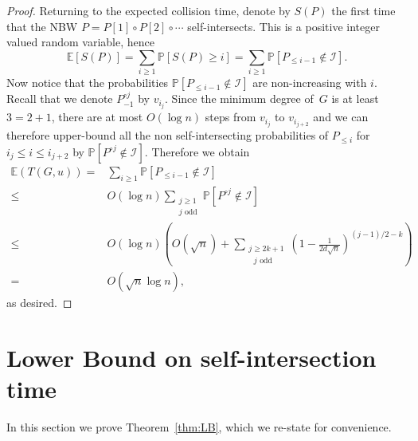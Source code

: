 \documentclass[11pt,a4paper]{article}
\theoremstyle{plain}
\def\calI{\mathcal{I}}
\renewcommand{\Pr}{\mathbb{P}}
\begin{document}
\begin{proof}
Returning to the expected collision time, denote by $S(P)$ the first time that the NBW $P=P[1]\circ P[2]\circ \cdots$ self-intersects. This is a positive integer valued random variable, hence 
$$
\mathbb{E}[S(P)]=\sum_{i\geq 1} \Pr[S(P)\geq i] = \sum_{i\ge 1} \Pr[P_{\leq i-1} \notin \calI].
$$
Now notice that  the probabilities $\Pr[P_{\leq i-1} \notin \calI]$ are  non-increasing with $i$. Recall that we denote $P^{\circ j}_{-1}$ by $v_{i_j}$. 
Since the minimum degree of~$G$ is at least $3=2+1$,  there are at most $O(\log n)$ steps from $v_{i_j}$ to $v_{i_{j+2}}$ and we can therefore upper-bound all the non self-intersecting probabilities of $P_{\leq i}$ for $i_j\leq i\leq i_{j+2}$ by $\Pr[P^{\circ j} \notin \calI]$.
Therefore we obtain
\begin{align*}
\mathbb{E}(T(G,u))=&\sum_{i\geq 1}\Pr[P_{\leq i-1} \notin \calI]\\
\leq &O(\log n)\sum_{\substack{j\geq 1\\ \text{$j$ odd}}} \Pr[ P^{\circ j} \notin \calI]
\\
\leq &O(\log n)\left (O(\sqrt{n})+\sum_{\substack{j\geq 2k+1 \\ \text{ $j$ odd}}} \left(1-\frac{1}{2d \sqrt{n}}\right)^{(j-1)/2-k}\right)
\\
=&O(\sqrt{n}\log n),
\end{align*}
as desired.
\end{proof}




 




\section{Lower Bound on self-intersection time}
 
In this section we prove Theorem~\ref{thm:LB}, which we re-state for convenience.
\thmLB*
 
\end{document}
